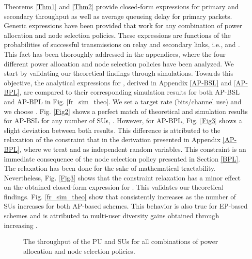 \documentclass[journal,twocolumn]{IEEEtran}
\begin{document}
Theorems \ref{Thm1} and \ref{Thm2} provide closed-form expressions for primary and secondary throughput as well as average queueing delay for primary packets. Generic expressions have been provided that work for any combination of power allocation and node selection policies. These expressions are functions of the probabilities of successful transmissions on relay and secondary links, i.e.,  and . This fact has been thoroughly addressed in the appendices, where the four different power allocation and node selection policies have been analyzed. We start by validating our theoretical findings through simulations. Towards this objective, the analytical expressions for , derived in Appendix \ref{AP-BSL} and \ref{AP-BPL}, are compared to their corresponding simulation results for both AP-BSL and AP-BPL in Fig. \ref{fr_sim_theo}. We set a target rate  (bits/channel use) and we choose . Fig. \ref{Fig2} shows a perfect match of theoretical and simulation results for AP-BSL for any number of SUs, . However, for AP-BPL, Fig. \ref{Fig3} shows a slight deviation between both results. This difference is attributed to the relaxation of the constraint that  in the derivation presented in Appendix \ref{AP-BPL}, where we treat  and  as independent random variables. This constraint is an immediate consequence of the node selection policy presented in Section \ref{BPL}. The relaxation has been done for the sake of mathematical tractability. Nevertheless, Fig. \ref{Fig3} shows that the constraint relaxation has a minor effect on the obtained closed-form expression for . This validates our theoretical findings. Fig. \ref{fr_sim_theo} show that  consistently increases as the number of SUs increases for both AP-based schemes. This behavior is also true for EP-based schemes and is attributed to multi-user diversity gains obtained through increasing .      




\begin{figure*}[t]
 \centering
 \caption{The throughput of the PU and SUs for all combinations of power allocation and node selection policies.}
 \label{PU_SU_thrpt}
  \vspace{-3mm}
\end{figure*}
\end{document}
